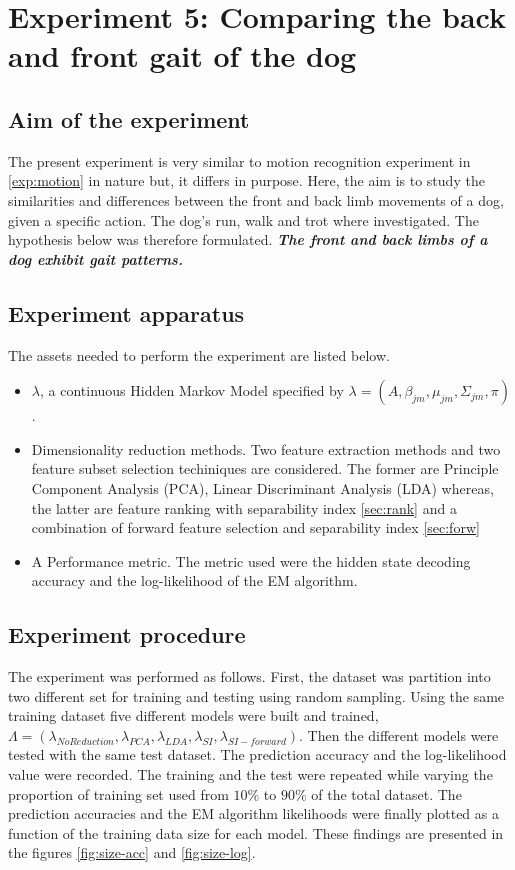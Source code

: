 \newpage
\section{Experiment 5: Comparing the back and front gait of the dog}  \label{exp:front-back}

\subsection{Aim of the experiment}
The present experiment is very similar to motion recognition experiment in \ref{exp:motion} in nature but, it differs in purpose. Here, the aim is to study the similarities and differences between the front and back limb movements of a dog, given a specific action. The dog's run, walk and trot where investigated.
The hypothesis below was therefore formulated.
\textbf{\textit{The front and back limbs of a dog exhibit gait patterns.}}

\subsection{Experiment apparatus}
The assets needed to perform the experiment are listed below.
\begin{itemize}
	\item \(\lambda\), a continuous Hidden Markov Model specified by \(\lambda = (A, \beta_{jm}, \mu_{jm}, \Sigma_{jm}, \pi)\).
	\item Dimensionality reduction methods. Two feature extraction methods and two feature subset selection techiniques are considered. The former are Principle Component Analysis (PCA), Linear Discriminant Analysis (LDA) whereas, the latter are feature ranking with separability index \ref{sec:rank}
	and a combination of forward feature selection and separability index \ref{sec:forw}
	\item A Performance metric. The metric used were the hidden state decoding accuracy and the log-likelihood of the EM algorithm.
\end{itemize}

\subsection{Experiment procedure}
The experiment was performed as follows.
First, the dataset was partition into two different set for training and testing using random sampling.
Using the same training dataset five different models were built and trained, \(\Lambda = (\lambda_{No Reduction}, \lambda_{PCA}, \lambda_{LDA}, \lambda_{SI}, \lambda_{SI-forward})\).
Then the different models were tested with the same test dataset. The prediction accuracy and the log-likelihood value were recorded.
The training and the test were repeated while varying the proportion of training set used from \(10\%\) to \(90\%\) of the total dataset.
The prediction accuracies and the EM algorithm likelihoods were finally plotted as a function of the training data size for each model.
These findings are presented in the figures \ref{fig:size-acc} and \ref{fig:size-log}. 

